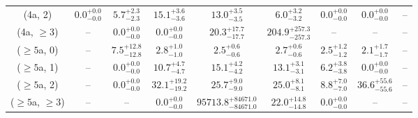 \begin{table}[h!]
{\begin{tabular}{ccccccccc}
	(4a, 2) & $0.0^{+ 0.0 }_{- 0.0 }$ & $5.7^{+ 2.3 }_{- 2.3 }$ & $15.1^{+ 3.6 }_{- 3.6 }$ & $13.0^{+ 3.5 }_{- 3.5 }$ & $6.0^{+ 3.2 }_{- 3.2 }$ & $0.0^{+ 0.0 }_{- 0.0 }$ & $0.0^{+ 0.0 }_{- 0.0 }$ & -- \\[0.5ex] 
	(4a, $\ge3$) & -- & $0.0^{+ 0.0 }_{- 0.0 }$ & $0.0^{+ 0.0 }_{- 0.0 }$ & $20.3^{+ 17.7 }_{- 17.7 }$ & $204.9^{+ 257.3 }_{- 257.3 }$ & -- & -- & -- \\[0.5ex] 
	($\ge5$a, 0) & -- & $7.5^{+ 12.8 }_{- 12.8 }$ & $2.8^{+ 1.0 }_{- 1.0 }$ & $2.5^{+ 0.6 }_{- 0.6 }$ & $2.7^{+ 0.6 }_{- 0.6 }$ & $2.5^{+ 1.2 }_{- 1.2 }$ & $2.1^{+ 1.7 }_{- 1.7 }$ & -- \\[0.5ex] 
	($\ge5$a, 1) & -- & $0.0^{+ 0.0 }_{- 0.0 }$ & $10.7^{+ 4.7 }_{- 4.7 }$ & $15.1^{+ 4.2 }_{- 4.2 }$ & $13.1^{+ 3.1 }_{- 3.1 }$ & $6.2^{+ 3.8 }_{- 3.8 }$ & $0.0^{+ 0.0 }_{- 0.0 }$ & -- \\[0.5ex] 
	($\ge5$a, 2) & -- & $0.0^{+ 0.0 }_{- 0.0 }$ & $32.1^{+ 19.2 }_{- 19.2 }$ & $25.7^{+ 9.0 }_{- 9.0 }$ & $25.0^{+ 8.1 }_{- 8.1 }$ & $8.8^{+ 7.0 }_{- 7.0 }$ & $36.6^{+ 55.6 }_{- 55.6 }$ & -- \\[0.5ex] 
	($\ge5$a, $\ge3$) & -- & -- & $0.0^{+ 0.0 }_{- 0.0 }$ & $95713.8^{+ 84671.0 }_{- 84671.0 }$ & $22.0^{+ 14.8 }_{- 14.8 }$ & $0.0^{+ 0.0 }_{- 0.0 }$ & -- & -- \\[0.5ex] 
	\hline
	\hline
\end{tabular}}
\end{table}
